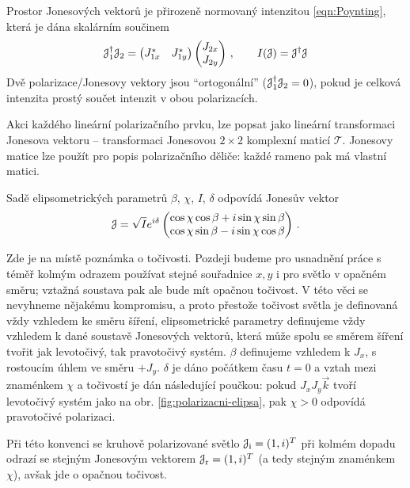 Prostor Jonesových vektorů je přirozeně normovaný intenzitou \eqref{eqn:Poynting}, která je dána skalárním součinem
\begin{equation}
    \mathcal{J}_1^\dagger \mathcal{J}_2= \begin{pmatrix} J_{1x}^* & J_{1y}^* \end{pmatrix}
    \begin{pmatrix} J_{2x} \\ J_{2y} \end{pmatrix} \,, 
    \qquad I(\mathcal{J})=\mathcal{J}^\dagger \mathcal{J}
\end{equation}
Dvě polarizace/Jonesovy vektory jsou ``ortogonální'' ($\mathcal{J}_1^\dagger \mathcal{J}_2=0$), pokud je celková intenzita prostý součet intenzit v obou polarizacích.

Akci každého lineární polarizačního prvku, lze popsat jako lineární transformaci Jonesova vektoru -- transformaci Jonesovou $2\times 2$ komplexní maticí $\mathcal{T}$.
Jonesovy matice lze použít pro popis polarizačního děliče: každé rameno pak má vlastní matici.

Sadě elipsometrických parametrů $\beta$, $\chi$, $I$, $\delta$ odpovídá Jonesův vektor
\begin{equation} 
\label{eqn:Jones-elipsa}
    \mathcal{J}=\sqrt{I} e^{i\delta} \begin{pmatrix}
        \cos \chi \cos \beta + i \sin \chi \sin \beta \\
        \cos \chi \sin \beta - i \sin \chi \cos \beta
    \end{pmatrix} \,.
\end{equation}

Zde je na místě poznámka o točivosti.
Pozdeji budeme pro usnadnění práce s téměř kolmým odrazem používat stejné souřadnice $x,y$ i pro světlo v opačném směru; vztažná soustava pak ale bude mít opačnou točivost.
V této věci se nevyhneme nějakému kompromisu, a proto přestože točivost světla je definovaná vždy vzhledem ke směru šíření, elipsometrické parametry definujeme vždy vzhledem k dané soustavě Jonesových vektorů, která může spolu se směrem šíření tvořit jak levotočivý, tak pravotočivý systém.
$\beta$ definujeme vzhledem k $J_x$, s rostoucím úhlem ve směru $+J_y$.
$\delta$ je dáno počátkem času $t=0$ a vztah mezi znaménkem $\chi$ a točivostí je dán následující poučkou: pokud $J_x J_y \vec{k}$ tvoří levotočivý systém jako na obr. \ref{fig:polarizacni-elipsa}, pak $\chi>0$ odpovídá pravotočivé polarizaci.

Při této konvenci se kruhově polarizované světlo $\mathcal{J}_\textrm{i}=(1, i)^T$ při kolmém dopadu odrazí se stejným Jonesovým vektorem $\mathcal{J}_\textrm{r}=(1, i)^T$ (a tedy stejným znaménkem $\chi$), avšak jde o opačnou točivost.


